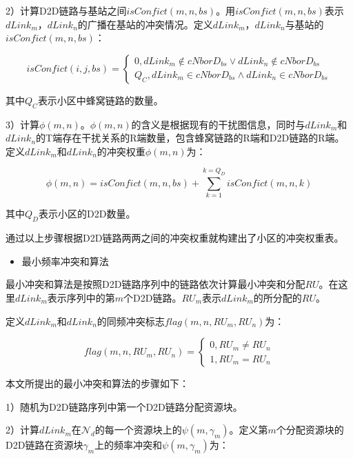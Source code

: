 \documentclass[figurelist,tablelist,algorithmlist,nomlist,masters]{seuthesix}
\begin{document}
	2）计算D2D链路与基站之间$isConfict(m,n,bs)$。用$isConfict(m,n,bs)$表示$dLink_m$，$dLink_n$的广播在基站的冲突情况。定义$dLink_m$，$dLink_n$与基站的$isConfict(m,n,bs)$：
	
	\begin{equation}\label{eq2.4}
	isConfict(i,j,bs) = \left\{ \begin{array}{l} 0,dLink_m \notin cNborD_{bs} \lor dLink_n \notin cNborD_{bs}\\Q_C,dLink_m \in cNborD_{bs} \land dLink_n \in cNborD_{bs} \end{array} \right.
	\end{equation}
	
	其中$Q_C$表示小区中蜂窝链路的数量。
	
	3）计算$\phi (m,n)$。$\phi (m,n)$的含义是根据现有的干扰图信息，同时与$dLink_m$和$dLink_n$的T端存在干扰关系的R端数量，包含蜂窝链路的R端和D2D链路的R端。定义$dLink_m$和$dLink_n$的冲突权重$\phi (m,n)$为：
	
	\begin{equation}\label{eq2.5}
	\phi (m,n) = isConfict(m,n,bs) + \sum\limits_{k = 1}^{k = Q_D} {isConfict(m,n,k)}
	\end{equation}
	
	其中$Q_D$表示小区的D2D数量。
	
	通过以上步骤根据D2D链路两两之间的冲突权重就构建出了小区的冲突权重表。
	
	\begin{itemize}
		\item 最小频率冲突和算法
	\end{itemize}
	
	最小冲突和算法是按照D2D链路序列中的链路依次计算最小冲突和分配$RU$。在这里$dLink_m$表示序列中的第$m$个D2D链路。$RU_m$表示$dLink_m$的所分配的$RU$。
	
	定义$dLink_m$和$dLink_n$的同频冲突标志$flag(m,n,RU_m,RU_n)$为：
	
	\begin{equation}\label{eq2.6}
	flag(m,n,RU_m,RU_n) = \left\{ \begin{array}{l} 0,RU_m \ne RU_n\\1,RU_m = RU_n\end{array} \right.
	\end{equation}
	
	
	
	本文所提出的最小冲突和算法的步骤如下：
	
	1）随机为D2D链路序列中第一个D2D链路分配资源块。
	
	2）计算$dLink_m$在$\mathcal{N}_d$的每一个资源块上的$\psi (m,\gamma _m)$。定义第$m$个分配资源块的D2D链路在资源块$\gamma _m$上的频率冲突和$\psi (m,\gamma _m)$为：
	
\end{document}
